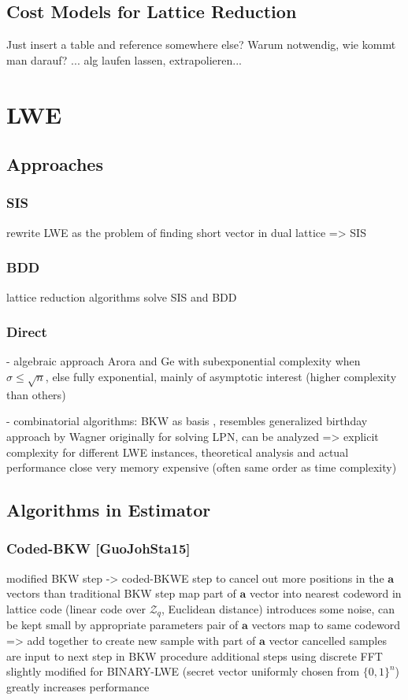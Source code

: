 \documentclass[
  a4paper,  %
  twoside,  %
  bibliography=totoc,
  headsepline,
  cleardoublepage=empty,
  parskip=half,
  draft=false
]{scrbook}
\begin{document}
\subsection{Cost Models for Lattice Reduction}
Just insert a table and reference somewhere else? Warum notwendig, wie kommt man darauf? ... alg laufen lassen, extrapolieren...


\section{LWE}
\subsection{Approaches}
\subsubsection{SIS}
rewrite LWE as the problem of finding short vector in dual lattice => SIS
\subsubsection{BDD}

lattice reduction algorithms solve SIS and BDD 
\subsubsection{Direct}

- algebraic approach Arora and Ge with subexponential complexity when $\sigma \leq \sqrt{n}$, else fully exponential, mainly of asymptotic interest (higher complexity than others)

- combinatorial algorithms: BKW as basis \cite{BKW03}, resembles generalized birthday approach by Wagner %
originally for solving LPN, can be analyzed => explicit complexity for different LWE instances, theoretical analysis and actual performance close
very memory expensive (often same order as time complexity) 

\subsection{Algorithms in Estimator}
\subsubsection{Coded-BKW [GuoJohSta15]}
modified BKW step -> coded-BKWE step to cancel out more positions in the $\textbf{a}$ vectors than traditional BKW step
map part of $\textbf{a}$ vector into nearest codeword in lattice code (linear code over $\mathcal{Z}_q$, Euclidean distance)
introduces some noise, can be kept small by appropriate parameters
pair of $\textbf{a}$ vectors map to same codeword => add together to create new sample with part of $\textbf{a}$ vector cancelled
samples are input to next step in BKW procedure
additional steps using discrete FFT
slightly modified for BINARY-LWE (secret vector uniformly chosen from $\{0, 1\}^n$) greatly increases performance
\end{document}
